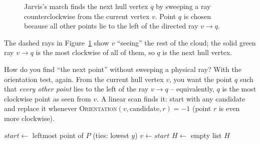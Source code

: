 \begin{figure}[htbp]
\centering
{}
\caption{Jarvis's march finds the next hull vertex $q$ by sweeping a ray counterclockwise from the current vertex $v$. Point $q$ is chosen because all other points lie to the left of the directed ray $v \to q$.}
\label{ch32:fig-jarvis}
\end{figure}

The dashed rays in Figure~\ref{ch32:fig-jarvis} show $v$ ``seeing'' the rest of the cloud; the solid
green ray $v \to q$ is the most clockwise of all of them, so $q$ is the next hull
vertex.

How do you find ``the next point'' without sweeping a physical ray? With the
orientation test, again. From the current hull vertex $v$, you want the point $q$
such that \emph{every other point} lies to the left of the ray $v \to q$ --
equivalently, $q$ is the most clockwise point as seen from $v$. A linear scan
finds it: start with any candidate and replace it whenever
\textsc{Orientation}$(v, \text{candidate}, r) = -1$ (point $r$ is even more
clockwise).

\begin{algorithm}[H]
\caption{\textsc{JarvisMarch}($P$)}
$\mathit{start} \leftarrow$ leftmost point of $P$ (ties: lowest $y$) 
$v \leftarrow \mathit{start}$\;
$H \leftarrow$ empty list\;
\Return $H$\;
\end{algorithm}

